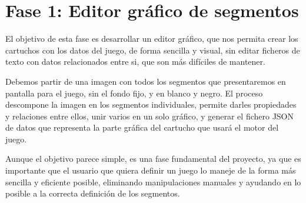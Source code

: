 \section{Fase 1: Editor gráfico de segmentos}
\label{sec:Primera-Fase}

El objetivo de esta fase es desarrollar un editor gráfico, que nos permita crear los cartuchos con los datos del juego, de forma sencilla y visual, sin editar ficheros de texto con datos relacionados entre si, que son más difíciles de mantener.

Debemos partir de una imagen con todos los segmentos que presentaremos en pantalla para el juego, sin el fondo fijo, y en blanco y negro. El proceso descompone la imagen en los segmentos individuales, permite darles propiedades y relaciones entre ellos, unir varios en un solo gráfico, y generar el fichero JSON de datos que representa la parte gráfica del cartucho que usará el motor del juego.

Aunque el objetivo parece simple, es una fase fundamental del proyecto, ya que es importante que el usuario que quiera definir un juego lo maneje de la forma más sencilla y eficiente posible, eliminando manipulaciones manuales y ayudando en lo posible a la correcta definición de los segmentos.

